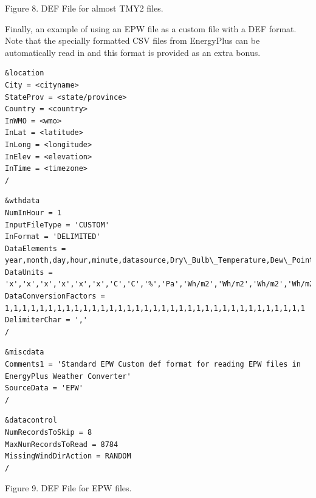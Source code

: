 Figure 8. DEF File for almost TMY2 files.

Finally, an example of using an EPW file as a custom file with a DEF format. Note that the specially formatted CSV files from EnergyPlus can be automatically read in and this format is provided as an extra bonus.

\begin{lstlisting}
&location
City = <cityname>
StateProv = <state/province>
Country = <country>
InWMO = <wmo>
InLat = <latitude>
InLong = <longitude>
InElev = <elevation>
InTime = <timezone>
/
\end{lstlisting}

\begin{lstlisting}
&wthdata
NumInHour = 1
InputFileType = 'CUSTOM'
InFormat = 'DELIMITED'
DataElements = year,month,day,hour,minute,datasource,Dry\_Bulb\_Temperature,Dew\_Point\_Temperature,Relative\_Humidity,Atmospheric\_Pressure,Extraterrestrial\_Horizontal\_Radiation,Extraterrestrial\_Direct\_Normal\_Radiation,Horizontal\_Infrared\_Radiation\_Intensity\_from\_Sky,Global\_Horizontal\_Radiation,Direct\_Normal\_Radiation,Diffuse\_Horizontal\_Radiation,Global\_Horizontal\_Illuminance,Direct\_Normal\_Illuminance,Diffuse\_Horizontal\_Illuminance,Zenith\_Luminance,Wind\_Direction,Wind\_Speed,Total\_Sky\_Cover,Opaque\_Sky\_Cover,Visibility,Ceiling\_Height,Present\_Weather\_Observation,Present\_Weather\_Codes,Precipitable\_Water,Aerosol\_Optical\_Depth,Snow\_Depth,Days\_Since\_Last\_Snow,Albedo,Liquid\_Precipitation\_Depth,Liquid\_Precipitation\_Quantity
DataUnits = 'x','x','x','x','x','x','C','C','%','Pa','Wh/m2','Wh/m2','Wh/m2','Wh/m2','Wh/m2','Wh/m2','lux','lux','lux','Cd/m2','deg','m/s','tenths','tenths','km','m','x','x','mm','{.001}','cm','x','{.01}','mm','hr'
DataConversionFactors = 1,1,1,1,1,1,1,1,1,1,1,1,1,1,1,1,1,1,1,1,1,1,1,1,1,1,1,1,1,1,1,1,1,1,1
DelimiterChar = ','
/
\end{lstlisting}

\begin{lstlisting}
&miscdata
Comments1 = 'Standard EPW Custom def format for reading EPW files in EnergyPlus Weather Converter'
SourceData = 'EPW'
/
\end{lstlisting}

\begin{lstlisting}
&datacontrol
NumRecordsToSkip = 8
MaxNumRecordsToRead = 8784
MissingWindDirAction = RANDOM
/
\end{lstlisting}

Figure 9. DEF File for EPW files.

